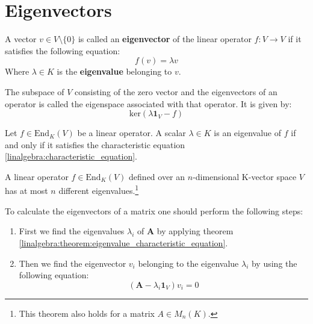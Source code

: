 \section{Eigenvectors}
	
	\begin{definition}[Eigenvector]
		A vector $v\in V\setminus\{0\}$ is called an \textbf{eigenvector} of the linear operator $f: V\rightarrow V$ if it satisfies the following equation:
        	\begin{equation}
			f(v) = \lambda v
		\end{equation}
        	Where $\lambda \in K$ is the \textbf{eigenvalue} belonging to $v$.
	\end{definition}
	\begin{definition}[Eigenspace]
		The subspace of $V$ consisting of the zero vector and the eigenvectors of an operator is called the eigenspace associated with that operator. It is given by:
        	\begin{equation}
			\text{ker}(\lambda\boldsymbol{1}_V - f)
		\end{equation}
	\end{definition}

	\begin{theorem}\label{linalgebra:theorem:eigenvalue_characteristic_equation}
	    	Let $f\in\text{End}_K(V)$ be a linear operator. A scalar $\lambda\in K$ is an eigenvalue of $f$ if and only if it satisfies the characteristic equation \ref{linalgebra:characteristic_equation}.
	\end{theorem}
    
	\begin{theorem}
		A linear operator $f\in\text{End}_K(V)$ defined over an $n$-dimensional K-vector space $V$ has at most $n$ different eigenvalues.\footnote{This theorem also holds for a matrix $A\in M_n(K)$.}
	\end{theorem}
    
	\begin{method}
		To calculate the eigenvectors of a matrix one should perform the following steps:
		\begin{enumerate}
			\item First we find the eigenvalues $\lambda_i$ of $\mathbf{A}$ by applying theorem \ref{linalgebra:theorem:eigenvalue_characteristic_equation}.
		        \item Then we find the eigenvector $v_i$ belonging to the eigenvalue $\lambda_i$ by using the following equation:
			        \begin{equation}
					\label{linalgebra:eigenvectors:eigenspace}
                			\left(\mathbf{A} - \lambda_i\mathbf{1}_V\right)v_i = 0
				\end{equation}
		\end{enumerate}
	\end{method}
    

